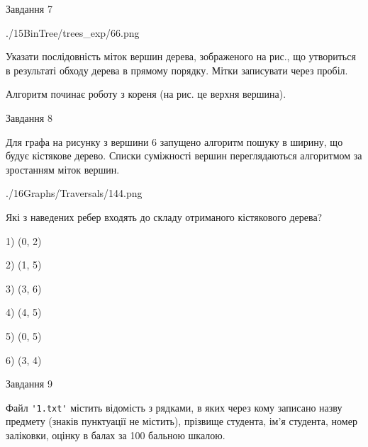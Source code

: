 \documentclass[12pt, ukrainian]{article}
\def\code#1{\Verb!#1!}
\begin{document}
{\newpage
\begin{minipage}[t]{9.7cm}
               
{\begin{center}Завдання {7}\end{center}}
\vspace{-6mm}

\begin{center}
	{./15BinTree/trees_exp/66.png}
\end{center}
Указати послідовність міток вершин дерева, зображеного на рис., що утвориться в результаті обходу дерева в прямому порядку. Мітки записувати через пробіл.\par Алгоритм починає роботу з кореня (на рис. це верхня вершина).\par

\end{minipage}
\vline \hspace{8mm}
\begin{minipage}[t]{8.0cm}
               
{\begin{center}Завдання {8}\end{center}}
\vspace{-6mm}
Для графа на рисунку з вершини 6 запущено алгоритм пошуку в ширину, що будує кістякове дерево. Списки суміжності вершин переглядаються алгоритмом за зростанням міток вершин.\par
\begin{center}
	{./16Graphs/Traversals/144.png}
\end{center}
\par Які з наведених ребер входять до складу отриманого кістякового дерева?\par
1) (0, 2)\par
2) (1, 5)\par
3) (3, 6)\par
4) (4, 5)\par
5) (0, 5)\par
6) (3, 4)\par
{\vskip 15pt} \par

\end{minipage}

               
{\begin{center}Завдання {9}\end{center}}
\vspace{-6mm}
Файл \code{'1.txt'} містить відомість з рядками, в яких через кому записа\-но назву предмету (знаків пунктуації не містить), прізвище студента, ім'я студента, номер залі\-ков\-ки, оцінку в балах за 100 бальною шкалою.

}
\end{document}
